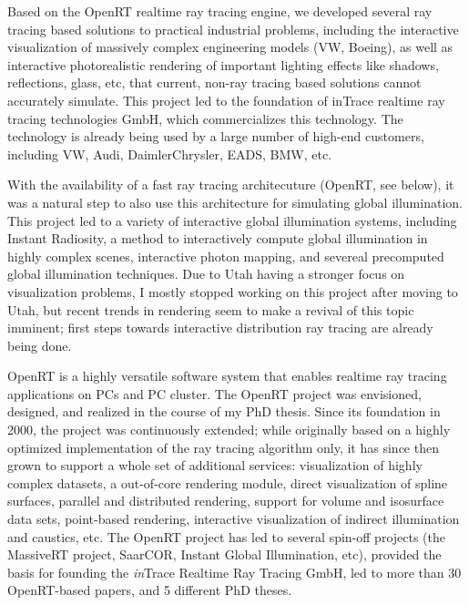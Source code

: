 \documentclass[letterpaper,11pt]{moderncv}
\begin{document}
 { Based on the OpenRT realtime ray tracing
  engine, we developed several ray tracing based solutions to
  practical industrial problems, including the interactive
  visualization of massively complex engineering models (VW, Boeing),
  as well as interactive photorealistic rendering of important
  lighting effects like shadows, reflections, glass, etc, that
  current, non-ray tracing based solutions cannot accurately simulate.
  This project led to the foundation of inTrace realtime ray tracing
  technologies GmbH, which commercializes this technology. The
  technology is already being used by a large number of high-end
  customers, including VW, Audi, DaimlerChrysler, EADS, BMW,
  etc.  }{}

 {
With the availability of a fast ray tracing architecuture (OpenRT, see
below), it was a natural step to also use this architecture for
simulating global illumination. This project led to a variety of
interactive global illumination systems, including Instant Radiosity,
a method to interactively compute global illumination in highly
complex scenes, interactive photon mapping, and severeal precomputed
global illumination techniques. Due to Utah having a stronger focus on
visualization problems, I mostly stopped working on this project after
moving to Utah, but recent trends in rendering seem to make a revival
of this topic imminent; first steps towards interactive distribution
ray tracing are already being done.} {}

{OpenRT is a highly versatile software system that enables realtime ray
  tracing applications on PCs and PC cluster.
%
The OpenRT project was envisioned, designed, and realized in the
  course of my PhD thesis. Since its foundation in 2000, the project
  was continuously extended; while originally based on a highly
  optimized implementation of the ray tracing algorithm only, it has
  since then grown to support a whole set of additional services:
  visualization of highly complex datasets, a out-of-core rendering
  module, direct visualization of spline surfaces, parallel and
  distributed rendering, support for volume and isosurface data sets,
  point-based rendering, interactive visualization of indirect
  illumination and caustics, etc. The OpenRT project has led to
  several spin-off projects (the MassiveRT project, SaarCOR, Instant
  Global Illumination, etc), provided the basis for founding the
  \emph{in}Trace Realtime Ray Tracing GmbH, led to more than 30
  OpenRT-based papers, and 5 different PhD theses.}{}
\end{document}
